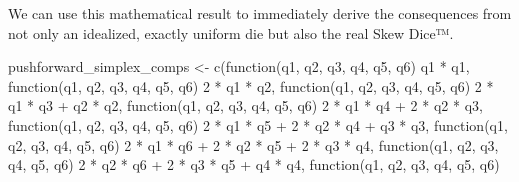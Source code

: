 \documentclass[
  letterpaper,
  DIV=11,
  numbers=noendperiod]{scrartcl}
\newenvironment{Shaded}{\begin{snugshade}}{\end{snugshade}}
\newcommand{\ControlFlowTok}[1]{\textcolor[rgb]{0.00,0.23,0.31}{#1}}
\newcommand{\DecValTok}[1]{\textcolor[rgb]{0.68,0.00,0.00}{#1}}
\newcommand{\FunctionTok}[1]{\textcolor[rgb]{0.28,0.35,0.67}{#1}}
\newcommand{\NormalTok}[1]{\textcolor[rgb]{0.00,0.23,0.31}{#1}}
\newcommand{\OtherTok}[1]{\textcolor[rgb]{0.00,0.23,0.31}{#1}}
\newcommand{\SpecialCharTok}[1]{\textcolor[rgb]{0.37,0.37,0.37}{#1}}
\begin{document}
We can use this mathematical result to immediately derive the
consequences from not only an idealized, exactly uniform die but also
the real Skew Dice™.

\begin{Shaded}
\begin{Highlighting}[]
\NormalTok{pushforward\_simplex\_comps }\OtherTok{\textless{}{-}} \FunctionTok{c}\NormalTok{(}\ControlFlowTok{function}\NormalTok{(q1, q2, q3, q4, q5, q6)}
\NormalTok{                                   q1 }\SpecialCharTok{*}\NormalTok{ q1,}
                               \ControlFlowTok{function}\NormalTok{(q1, q2, q3, q4, q5, q6)}
                               \DecValTok{2} \SpecialCharTok{*}\NormalTok{ q1 }\SpecialCharTok{*}\NormalTok{ q2,}
                               \ControlFlowTok{function}\NormalTok{(q1, q2, q3, q4, q5, q6)}
                               \DecValTok{2} \SpecialCharTok{*}\NormalTok{ q1 }\SpecialCharTok{*}\NormalTok{ q3 }\SpecialCharTok{+}\NormalTok{     q2 }\SpecialCharTok{*}\NormalTok{ q2,}
                               \ControlFlowTok{function}\NormalTok{(q1, q2, q3, q4, q5, q6)}
                               \DecValTok{2} \SpecialCharTok{*}\NormalTok{ q1 }\SpecialCharTok{*}\NormalTok{ q4 }\SpecialCharTok{+} \DecValTok{2} \SpecialCharTok{*}\NormalTok{ q2 }\SpecialCharTok{*}\NormalTok{ q3,}
                               \ControlFlowTok{function}\NormalTok{(q1, q2, q3, q4, q5, q6)}
                               \DecValTok{2} \SpecialCharTok{*}\NormalTok{ q1 }\SpecialCharTok{*}\NormalTok{ q5 }\SpecialCharTok{+} \DecValTok{2} \SpecialCharTok{*}\NormalTok{ q2 }\SpecialCharTok{*}\NormalTok{ q4 }\SpecialCharTok{+}\NormalTok{     q3 }\SpecialCharTok{*}\NormalTok{ q3,}
                               \ControlFlowTok{function}\NormalTok{(q1, q2, q3, q4, q5, q6)}
                               \DecValTok{2} \SpecialCharTok{*}\NormalTok{ q1 }\SpecialCharTok{*}\NormalTok{ q6 }\SpecialCharTok{+} \DecValTok{2} \SpecialCharTok{*}\NormalTok{ q2 }\SpecialCharTok{*}\NormalTok{ q5 }\SpecialCharTok{+} \DecValTok{2} \SpecialCharTok{*}\NormalTok{ q3 }\SpecialCharTok{*}\NormalTok{ q4,}
                               \ControlFlowTok{function}\NormalTok{(q1, q2, q3, q4, q5, q6)}
                               \DecValTok{2} \SpecialCharTok{*}\NormalTok{ q2 }\SpecialCharTok{*}\NormalTok{ q6 }\SpecialCharTok{+} \DecValTok{2} \SpecialCharTok{*}\NormalTok{ q3 }\SpecialCharTok{*}\NormalTok{ q5 }\SpecialCharTok{+}\NormalTok{     q4 }\SpecialCharTok{*}\NormalTok{ q4,}
                               \ControlFlowTok{function}\NormalTok{(q1, q2, q3, q4, q5, q6)}

\end{Highlighting}
\end{Shaded}
\end{document}
